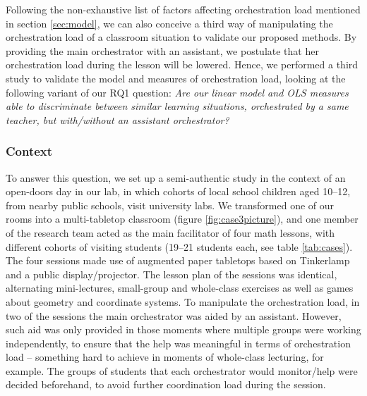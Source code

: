 \documentclass[10pt,journal,compsoc]{IEEEtran}
\begin{document}
Following the non-exhaustive list of factors affecting orchestration load mentioned in section \ref{sec:model}, we can also conceive a third way of manipulating the orchestration load of a classroom situation to validate our proposed methods. By providing the main orchestrator with an assistant, we postulate that her orchestration load during the lesson will be lowered. %
Hence, we performed a third study to validate the model and measures of orchestration load, looking at the following variant of our RQ1 question: \textit{Are our linear model and OLS measures able to discriminate between similar learning situations, orchestrated by a same teacher, but with/without an assistant orchestrator?}


\subsubsection{Context}

To answer this question, we set up a semi-authentic study in the context of an open-doors day in our lab, in which cohorts of local school children aged 10--12, from nearby public schools, visit university labs. We transformed one of our rooms into a multi-tabletop classroom (figure \ref{fig:case3picture}), and one member of the research team acted as the main facilitator of four math lessons, with different cohorts of visiting students (19--21 students each, see table \ref{tab:cases}). The four sessions made use of augmented paper tabletops based on Tinkerlamp \cite{do2012tinkerlamp} and a public display/projector. The lesson plan of the sessions was identical, alternating mini-lectures, small-group and whole-class exercises as well as games about geometry and coordinate systems. To manipulate the orchestration load, in two of the sessions the main orchestrator was aided by an assistant. However, such aid was only provided in those moments where multiple groups were working independently, to ensure that the help was meaningful in terms of orchestration load -- something hard to achieve in moments of whole-class lecturing, for example. The groups of students that each orchestrator would monitor/help were decided beforehand, to avoid further coordination load during the session.
\end{document}
